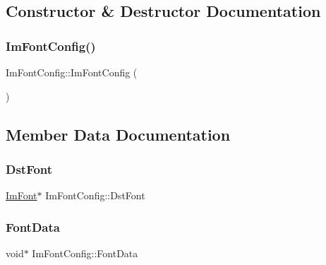 \subsection{Constructor \& Destructor Documentation}
\hypertarget{struct_im_font_config_af56ce39ce94ce0fb5171f4d8aa93f79c}{}\label{struct_im_font_config_af56ce39ce94ce0fb5171f4d8aa93f79c} 
\subsubsection{\texorpdfstring{Im\+Font\+Config()}{ImFontConfig()}}
{\footnotesize\ttfamily Im\+Font\+Config\+::\+Im\+Font\+Config (\begin{DoxyParamCaption}{ }\end{DoxyParamCaption})}



\subsection{Member Data Documentation}
\hypertarget{struct_im_font_config_a561773c311f6cf6de00642c2801e7b92}{}\label{struct_im_font_config_a561773c311f6cf6de00642c2801e7b92} 
\subsubsection{\texorpdfstring{Dst\+Font}{DstFont}}
{\footnotesize\ttfamily \hyperlink{struct_im_font}{Im\+Font}$\ast$ Im\+Font\+Config\+::\+Dst\+Font}

\hypertarget{struct_im_font_config_a0265861de7ba7b0d953e1c97e7a50cf3}{}\label{struct_im_font_config_a0265861de7ba7b0d953e1c97e7a50cf3} 
\subsubsection{\texorpdfstring{Font\+Data}{FontData}}
{\footnotesize\ttfamily void$\ast$ Im\+Font\+Config\+::\+Font\+Data}

\hypertarget{struct_im_font_config_a99dfbf61ef79cee89b6f03e17cbe63b4}{}\label{struct_im_font_config_a99dfbf61ef79cee89b6f03e17cbe63b4} 
